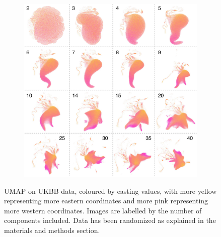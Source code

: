 \documentclass[12pt]{pnas-new}
\begin{document}
\begin{figure}
    \centering
    \begin{subfigure}{\textwidth}
    \includegraphics[width=\textwidth]{images/default_clean_size10_alpha60_ew.jpeg}
    \end{subfigure}
    \caption{UMAP on UKBB data, coloured by easting values, with more yellow representing more eastern coordinates and more pink representing more western coordinates. Images are labelled by the number of components included. Data has been randomized as explained in the materials and methods section.}
    \label{fig:supp_montage_ukbb_ew}
\end{figure}
\end{document}
